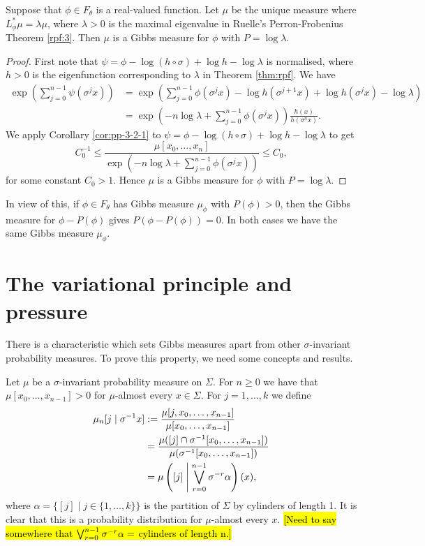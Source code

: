 \begin{corollary}
	Suppose that $\phi \in F_\theta$ is a real-valued function. Let $\mu$ be the unique measure where $L_\phi^*\mu = \lambda\mu$, where $\lambda > 0$ is the maximal eigenvalue in Ruelle's Perron-Frobenius Theorem \ref{rpf:3}. Then $\mu$ is a Gibbs measure for $\phi$ with $P = \log{\lambda}$.
	\begin{proof}
		First note that $\psi = \phi - \log{(h \circ \sigma)} + \log{h} - \log{\lambda}$ is normalised, where $h > 0$ is the eigenfunction corresponding to $\lambda$ in Theorem \ref{thm:rpf}. We have
		\begin{align*}
			\exp\left(\sum_{j = 0}^{n - 1}{\psi(\sigma^j{x})}\right) &= \exp\left(\sum_{j = 0}^{n - 1}{\phi(\sigma^j{x}) - \log{h(\sigma^{j + 1}{x})} + \log{h(\sigma^j{x})} - \log{\lambda}}\right) \\
				&= \exp\left(-n\log{\lambda} + \sum_{j = 0}^{n - 1}{\phi(\sigma^j{x})}\right) \frac{h(x)}{h(\sigma^n{x})}.
		\end{align*}
		We apply Corollary \ref{cor:pp-3-2-1} to $\psi = \phi - \log{(h \circ \sigma)} + \log{h} - \log{\lambda}$ to get
		\[
			C_0^{-1} \leq \frac{\mu[x_0, \dots, x_n]}{\exp\left(-n\log{\lambda} + \sum_{j = 0}^{n - 1}{\phi(\sigma^j{x})}\right)} \leq C_0,
		\]
		for some constant $C_0 > 1$. Hence $\mu$ is a Gibbs measure for $\phi$ with $P = \log{\lambda}$.
	\end{proof}
\end{corollary}

In view of this, if $\phi \in F_\theta$ has Gibbs measure $\mu_\phi$ with $P(\phi) > 0$, then the Gibbs measure for $\phi - P(\phi)$ gives $P(\phi - P(\phi)) = 0$. In both cases we have the same Gibbs measure $\mu_\phi$.

\section{The variational principle and pressure}
There is a characteristic which sets Gibbs measures apart from other $\sigma$-invariant probability measures. To prove this property, we need some concepts and results.

Let $\mu$ be a $\sigma$-invariant probability measure on $\Sigma$. For $n \geq 0$ we have that $\mu[x_0, \dots, x_{n - 1}] > 0$ for $\mu$-almost every $x \in \Sigma$. For $j = 1, \dots, k$ we define
\begin{align*}
	\mu_n[j \mid \sigma^{-1}{x}] &:= \frac{\mu[j, x_0, \dots, x_{n - 1}]}{\mu[x_0, \dots, x_{n - 1}]} \\
		&= \frac{\mu([j] \cap \sigma^{-1}[x_0, \dots, x_{n - 1}])}{\mu(\sigma^{-1}[x_0, \dots, x_{n - 1}])} \\
		&= \mu\left([j] \mathrel{}\middle|\mathrel{} \bigvee_{r = 0}^{n - 1}{\sigma^{-r}{\alpha}}\right)(x),
\end{align*}
where $\alpha = \{[j] \mid j \in \{1, \dots, k\}\}$ is the partition of $\Sigma$ by cylinders of length 1. It is clear that this is a probability distribution for $\mu$-almost every $x$. \hl{[Need to say somewhere that $\bigvee_{r = 0}^{n - 1}{\sigma^{-r}\alpha} =$ cylinders of length n.]}


